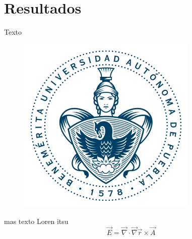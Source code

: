 \chapter{Resultados}
Texto
\begin{figure}[!h]
\centering
\includegraphics[width=.2\textwidth,keepaspectratio=true]{escudo-2}
\end{figure}

mas texto Loren itsu
\[ \vec E = \vec \nabla \cdot \vec \nabla \vec r \times \vec A
\]